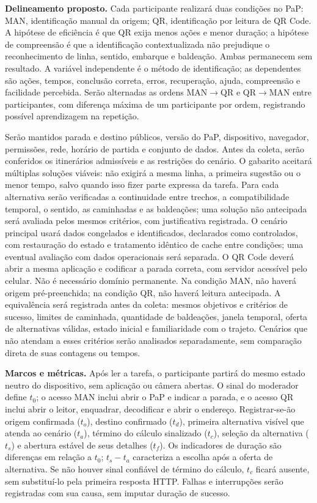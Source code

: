 \textbf{Delineamento proposto.} Cada participante realizará duas condições no PaP: MAN, identificação manual da origem; QR, identificação por leitura de QR Code. A hipótese de eficiência é que QR exija menos ações e menor duração; a hipótese de compreensão é que a identificação contextualizada não prejudique o reconhecimento de linha, sentido, embarque e baldeação. Ambas permanecem sem resultado. A variável independente é o método de identificação; as dependentes são ações, tempos, conclusão correta, erros, recuperação, ajuda, compreensão e facilidade percebida. Serão alternadas as ordens MAN$\rightarrow$QR e QR$\rightarrow$MAN entre participantes, com diferença máxima de um participante por ordem, registrando possível aprendizagem na repetição.

Serão mantidos parada e destino públicos, versão do PaP, dispositivo, navegador, permissões, rede, horário de partida e conjunto de dados. Antes da coleta, serão conferidos os itinerários admissíveis e as restrições do cenário. O gabarito aceitará múltiplas soluções viáveis: não exigirá a mesma linha, a primeira sugestão ou o menor tempo, salvo quando isso fizer parte expressa da tarefa. Para cada alternativa serão verificadas a continuidade entre trechos, a compatibilidade temporal, o sentido, as caminhadas e as baldeações; uma solução não antecipada será avaliada pelos mesmos critérios, com justificativa registrada. O cenário principal usará dados congelados e identificados, declarados como controlados, com restauração do estado e tratamento idêntico de cache entre condições; uma eventual avaliação com dados operacionais será separada. O QR Code deverá abrir a mesma aplicação e codificar a parada correta, com servidor acessível pelo celular. Não é necessário domínio permanente. Na condição MAN, não haverá origem pré-preenchida; na condição QR, não haverá leitura antecipada. A equivalência será registrada antes da coleta: mesmos objetivos e critérios de sucesso, limites de caminhada, quantidade de baldeações, janela temporal, oferta de alternativas válidas, estado inicial e familiaridade com o trajeto. Cenários que não atendam a esses critérios serão analisados separadamente, sem comparação direta de suas contagens ou tempos.

\textbf{Marcos e métricas.} Após ler a tarefa, o participante partirá do mesmo estado neutro do dispositivo, sem aplicação ou câmera abertas. O sinal do moderador define $t_0$; o acesso MAN inclui abrir o PaP e indicar a parada, e o acesso QR inclui abrir o leitor, enquadrar, decodificar e abrir o endereço. Registrar-se-ão origem confirmada ($t_o$), destino confirmado ($t_d$), primeira alternativa visível que atenda ao cenário ($t_a$), término do cálculo sinalizado ($t_c$), seleção da alternativa ($t_s$) e abertura estável de seus detalhes ($t_f$). Os indicadores de duração são diferenças em relação a $t_0$; $t_s-t_a$ caracteriza a escolha após a oferta de alternativa. Se não houver sinal confiável de término do cálculo, $t_c$ ficará ausente, sem substituí-lo pela primeira resposta HTTP. Falhas e interrupções serão registradas com sua causa, sem imputar duração de sucesso.

